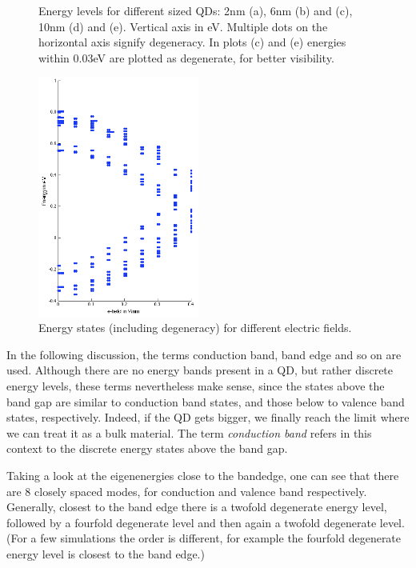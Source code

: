 \begin{figure}
\begin{subfigure}{60px}
		\caption{}
	\end{subfigure}
	\caption{Energy levels for different sized QDs: 2nm (a), 6nm (b) and (c), 10nm (d) and (e). Vertical axis in eV. Multiple dots on the horizontal axis signify degeneracy. In plots (c) and (e) energies within 0.03eV are plotted as degenerate, for better visibility.}
	\label{fig:e-levels}	
\end{figure}

\begin{figure}
	\centering
	\includegraphics[width=200px]{Fig/Plots/r25v.png}
	\caption{Energy states (including degeneracy) for different electric fields.}
	\label{fig:EvsVolt}
\end{figure}


\begin{REMARK}
In the following discussion, the terms conduction band, band edge and so on are used. Although there are no energy bands present in a QD, but rather discrete energy levels, these terms nevertheless make sense, since the states above the band gap are similar to conduction band states, and those below to valence band states, respectively. Indeed, if the QD gets bigger, we finally reach the limit where we can treat it as a bulk material. The term \textit{conduction band} refers in this context to the discrete energy states above the band gap.
\end{REMARK}
	
Taking a look at the eigenenergies close to the bandedge, one can see that there are 8 closely spaced modes, for conduction and valence band respectively. Generally, closest to the band edge there is a twofold degenerate energy level, followed by a fourfold degenerate level and then again a twofold degenerate level. (For a few simulations the order is different, for example the fourfold degenerate energy level is closest to the band edge.)
	
